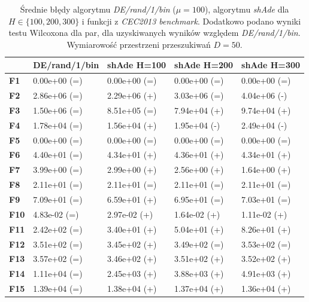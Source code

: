 \documentclass[12pt,a4paper]{report}
\begin{document}
{{{{{{{\begin{table}[h]
\centering
\caption{Średnie błędy algorytmu \emph{DE/rand/1/bin} ($\mu = 100$), algorytmu \emph{shAde} dla $H \in \{100, 200, 300\}$ i funkcji z \emph{CEC2013 benchmark}. Dodatkowo podano wyniki testu Wilcoxona dla par, dla uzyskiwanych wyników względem \emph{DE/rand/1/bin}. Wymiarowość przestrzeni przeszukiwań $D = 50$.}
\label{Anal20}
\begin{tabular}{|l|l|l|l|l|}
\hline
          & {\bf DE/rand/1/bin} & {\bf shAde H=100} & {\bf shAde H=200} & {\bf shAde H=300} \\ \hline
{\bf F1}  & 0.00e+00 (=)        & 0.00e+00 (=)     & 0.00e+00 (=)      & 0.00e+00 (=)      \\ \hline
{\bf F2}  & 2.86e+06 (=)        & 2.29e+06 (+)     & 3.03e+06 (=)      & 4.04e+06 (-)      \\ \hline
{\bf F3}  & 1.50e+06 (=)        & 8.51e+05 (=)     & 7.94e+04 (+)      & 9.74e+04 (+)      \\ \hline
{\bf F4}  & 1.78e+04 (=)        & 1.56e+04 (+)     & 1.95e+04 (-)      & 2.49e+04 (-)      \\ \hline
{\bf F5}  & 0.00e+00 (=)        & 0.00e+00 (=)     & 0.00e+00 (=)      & 0.00e+00 (=)      \\ \hline
{\bf F6}  & 4.40e+01 (=)        & 4.34e+01 (+)     & 4.36e+01 (+)      & 4.34e+01 (+)      \\ \hline
{\bf F7}  & 3.99e+00 (=)        & 2.99e+00 (+)     & 2.56e+00 (+)      & 1.64e+00 (+)      \\ \hline
{\bf F8}  & 2.11e+01 (=)        & 2.11e+01 (=)     & 2.11e+01 (=)      & 2.11e+01 (=)      \\ \hline
{\bf F9}  & 7.09e+01 (=)        & 6.59e+01 (+)     & 6.95e+01 (=)      & 7.03e+01 (=)      \\ \hline
{\bf F10} & 4.83e-02 (=)        & 2.97e-02 (+)     & 1.64e-02 (+)      & 1.11e-02 (+)      \\ \hline
{\bf F11} & 2.42e+02 (=)        & 3.40e+01 (+)     & 5.04e+01 (+)      & 8.26e+01 (+)      \\ \hline
{\bf F12} & 3.51e+02 (=)        & 3.45e+02 (+)     & 3.49e+02 (=)      & 3.53e+02 (=)      \\ \hline
{\bf F13} & 3.57e+02 (=)        & 3.46e+02 (+)     & 3.51e+02 (+)      & 3.52e+02 (+)      \\ \hline
{\bf F14} & 1.11e+04 (=)        & 2.45e+03 (+)     & 3.88e+03 (+)      & 4.91e+03 (+)      \\ \hline
{\bf F15} & 1.39e+04 (=)        & 1.38e+04 (+)     & 1.37e+04 (+)      & 1.36e+04 (+)      \\ \hline

\end{tabular}
\end{table}}}}}}}}
\end{document}
